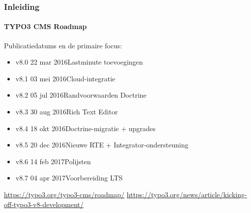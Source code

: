 \begin{frame}[fragile]
	\frametitle{Inleiding}
	\framesubtitle{TYPO3 CMS Roadmap}

	Publicatiedatums en de primaire focus:

	\begin{itemize}

		\item v8.0 \tabto{1.1cm}22 mar 2016\tabto{3.4cm}Lastminute toevoegingen
		\item v8.1 \tabto{1.1cm}03 mei 2016\tabto{3.4cm}Cloud-integratie
		\item v8.2 \tabto{1.1cm}05 jul 2016\tabto{3.4cm}Randvoorwaarden Doctrine
		\item v8.3 \tabto{1.1cm}30 aug 2016\tabto{3.4cm}Rich Text Editor
		\item v8.4 \tabto{1.1cm}18 okt 2016\tabto{3.4cm}Doctrine-migratie + upgrades
		\item v8.5 \tabto{1.1cm}20 dec 2016\tabto{3.4cm}Nieuwe RTE + Integrator-ondersteuning
		\item
			\begingroup
				\color{typo3orange}
					v8.6 \tabto{1.1cm}14 feb 2017\tabto{3.4cm}Polijsten
			\endgroup
		\item v8.7 \tabto{1.1cm}04 apr 2017\tabto{3.4cm}Voorbereiding LTS

	\end{itemize}

	\smaller
		\url{https://typo3.org/typo3-cms/roadmap/}\newline
		\url{https://typo3.org/news/article/kicking-off-typo3-v8-development/}
	\normalsize

\end{frame}

